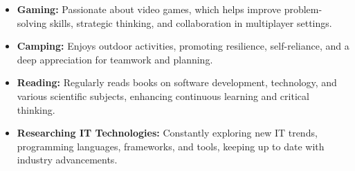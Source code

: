 

\begin{itemize}[left=0pt, itemsep=0.2em]
    \item \textbf{Gaming:} Passionate about video games, which helps improve problem-solving skills, strategic thinking, and collaboration in multiplayer settings.
    \item \textbf{Camping:} Enjoys outdoor activities, promoting resilience, self-reliance, and a deep appreciation for teamwork and planning.
    \item \textbf{Reading:} Regularly reads books on software development, technology, and various scientific subjects, enhancing continuous learning and critical thinking.
    \item \textbf{Researching IT Technologies:} Constantly exploring new IT trends, programming languages, frameworks, and tools, keeping up to date with industry advancements.
\end{itemize}